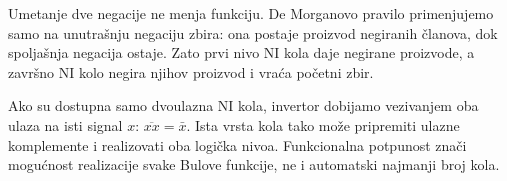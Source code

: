 Umetanje dve negacije ne menja funkciju. De Morganovo pravilo primenjujemo samo na unutrašnju negaciju zbira: ona postaje proizvod negiranih članova, dok spoljašnja negacija ostaje. Zato prvi nivo NI kola daje negirane proizvode, a završno NI kolo negira njihov proizvod i vraća početni zbir.

Ako su dostupna samo dvoulazna NI kola, invertor dobijamo vezivanjem oba ulaza na isti signal \(x\): \(\overline{xx}=\bar x\). Ista vrsta kola tako može pripremiti ulazne komplemente i realizovati oba logička nivoa. Funkcionalna potpunost znači mogućnost realizacije svake Bulove funkcije, ne i automatski najmanji broj kola.
